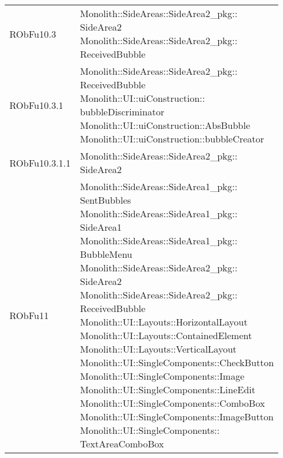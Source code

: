 \begin{center}
\begin{longtable}{|
*{1}{>{\centering\arraybackslash}m{2.5cm}|}
*{1}{>{\centering\arraybackslash}m{7.5cm}|}}
{\\}\\\hline
RObFu10.3 & \makecell[l]{Monolith::SideAreas::SideArea2\_pkg:: \\ \hfill SideArea2
\\Monolith::SideAreas::SideArea2\_pkg:: \\ \hfill ReceivedBubble
\\}\\\hline
RObFu10.3.1 & \makecell[l]{Monolith::SideAreas::SideArea2\_pkg:: \\ \hfill ReceivedBubble
\\Monolith::UI::uiConstruction:: \\ \hfill bubbleDiscriminator
\\Monolith::UI::uiConstruction::AbsBubble
\\Monolith::UI::uiConstruction::bubbleCreator
\\}\\\hline
RObFu10.3.1.1 & \makecell[l]{Monolith::SideAreas::SideArea2\_pkg:: \\ \hfill SideArea2
\\}\\\hline
RObFu11 & \makecell[l]{Monolith::SideAreas::SideArea1\_pkg:: \\ \hfill SentBubbles
\\Monolith::SideAreas::SideArea1\_pkg:: \\ \hfill SideArea1
\\Monolith::SideAreas::SideArea1\_pkg:: \\ \hfill BubbleMenu
\\Monolith::SideAreas::SideArea2\_pkg:: \\ \hfill SideArea2
\\Monolith::SideAreas::SideArea2\_pkg:: \\ \hfill ReceivedBubble
\\Monolith::UI::Layouts::HorizontalLayout
\\Monolith::UI::Layouts::ContainedElement
\\Monolith::UI::Layouts::VerticalLayout
\\Monolith::UI::SingleComponents::CheckButton
\\Monolith::UI::SingleComponents::Image
\\Monolith::UI::SingleComponents::LineEdit
\\Monolith::UI::SingleComponents::ComboBox
\\Monolith::UI::SingleComponents::ImageButton
\\Monolith::UI::SingleComponents:: \\ \hfill TextAreaComboBox
}
\end{longtable}
\end{center}

